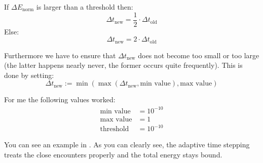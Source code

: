 \documentclass[a4paper,10pt,openany]{article}
\begin{document}
If $\Delta E_\mathrm{norm}$ is larger than a threshold then:
\begin{equation}
\Delta t_\mathrm{new} = \frac{1}{2} \cdot \Delta t_\mathrm{old}
\end{equation}
Else:
\begin{equation}
\Delta t_\mathrm{new} = 2 \cdot \Delta t_\mathrm{old}
\end{equation}

Furthermore we have to ensure that $\Delta t_\mathrm{new}$ does not become too small or too large (the latter happens nearly never, the former occurs quite frequently). This is done by setting:
\begin{equation}
\Delta t_\mathrm{new} := \min(\max(\Delta t_\mathrm{new}, \text{min value}), \text{max value} )
\end{equation}

For me the following values worked:
\begin{equation}
\begin{aligned}
\text{min value} &= 10^{-10}\\
\text{max value} &= 1\\
\text{threshold} &= 10^{-10}
\end{aligned}
\end{equation}

You can see an example in . As you can clearly see, the adaptive time stepping treats the close encounters properly and the total energy stays bound.
\end{document}
